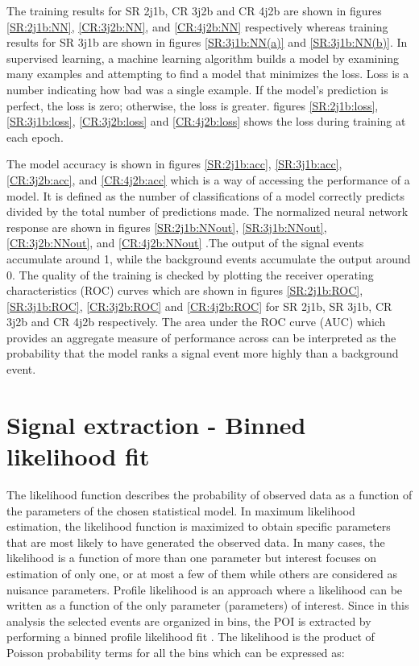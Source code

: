  The training results for SR 2j1b, CR 3j2b and CR 4j2b are shown in figures \ref{SR:2j1b:NN},  \ref{CR:3j2b:NN}, and \ref{CR:4j2b:NN} respectively whereas training results for SR 3j1b are shown in figures \ref{SR:3j1b:NN(a)} and \ref{SR:3j1b:NN(b)}. In supervised learning, a machine learning algorithm builds a model by examining many examples and attempting to find a model that minimizes the loss. Loss is a number indicating how bad was a single example. If the model's prediction is perfect, the loss is zero; otherwise, the loss is greater. figures \ref{SR:2j1b:loss},  \ref{SR:3j1b:loss},  \ref{CR:3j2b:loss} and  \ref{CR:4j2b:loss}  shows the loss during training at each epoch.

The model accuracy is shown in figures \ref{SR:2j1b:acc}, \ref{SR:3j1b:acc}, \ref{CR:3j2b:acc}, and  \ref{CR:4j2b:acc} which is a way of accessing the performance of a model. It is defined as the number of classifications of a model correctly predicts divided by the total number of predictions made. The normalized neural network response are shown in  figures \ref{SR:2j1b:NNout}, \ref{SR:3j1b:NNout}, \ref{CR:3j2b:NNout}, and \ref{CR:4j2b:NNout} .The output of the signal events accumulate around 1, while the background events accumulate the output around 0. The quality of the training is checked by plotting the receiver operating characteristics (ROC) curves which are shown in figures  \ref{SR:2j1b:ROC}, \ref{SR:3j1b:ROC},  \ref{CR:3j2b:ROC} and  \ref{CR:4j2b:ROC} for SR 2j1b, SR 3j1b, CR 3j2b and CR 4j2b respectively. The area under the ROC curve (AUC) which provides an aggregate measure of performance across can be interpreted as the probability that the model ranks a signal event more highly than a background event. 


\section{Signal extraction - Binned likelihood fit}
\label{sec: Profile_likehihood}
The likelihood function describes the probability of observed data as a function of the parameters of the chosen statistical model. In maximum likelihood estimation, the likelihood function is maximized to obtain specific parameters that are most likely to have generated the observed data. In many cases, the likelihood is a function of more than one parameter but interest focuses on estimation of only one, or at most a few of them while others are considered as nuisance parameters. Profile likelihood is an approach where a likelihood can be written as a function of the only parameter (parameters) of interest. Since in this analysis the selected events are organized in bins, the POI is extracted by performing a binned profile likelihood fit \cite{likelihood2011}. The likelihood is the product of Poisson probability terms for all the bins which can be expressed as:

